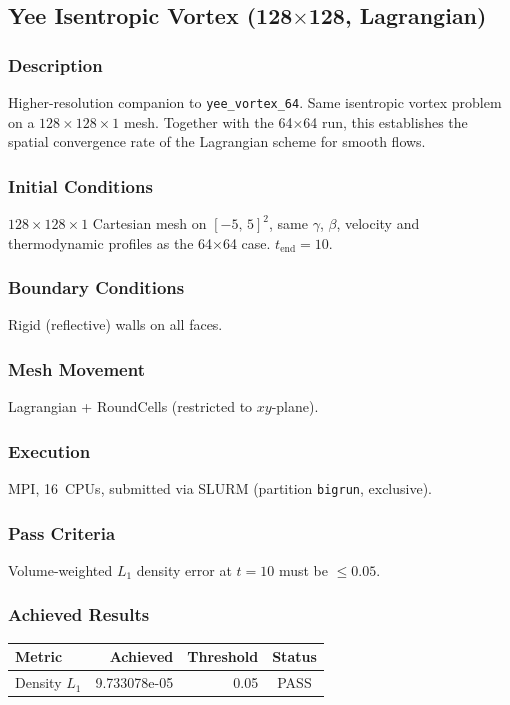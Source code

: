 \documentclass[11pt,a4paper]{article}
\begin{document}
\newpage

\subsection{Yee Isentropic Vortex (128$\times$128, Lagrangian)}
\label{sec:yee_vortex_128}

\subsubsection*{Description}
Higher-resolution companion to \texttt{yee\_vortex\_64}. Same isentropic vortex problem on a $128\times128\times1$ mesh. Together with the 64$\times$64 run, this establishes the spatial convergence rate of the Lagrangian scheme for smooth flows.

\subsubsection*{Initial Conditions}
$128\times128\times1$ Cartesian mesh on $[-5,\,5]^2$, same $\gamma$, $\beta$, velocity and thermodynamic profiles as the 64$\times$64 case. $t_{\mathrm{end}} = 10$.

\subsubsection*{Boundary Conditions}
Rigid (reflective) walls on all faces.

\subsubsection*{Mesh Movement}
Lagrangian + RoundCells (restricted to $xy$-plane).

\subsubsection*{Execution}
MPI, 16~CPUs, submitted via SLURM (partition \texttt{bigrun}, exclusive).

\subsubsection*{Pass Criteria}
Volume-weighted $L_1$ density error at $t=10$ must be $\le 0.05$.

\subsubsection*{Achieved Results}
\begin{table}[htbp]
\centering
\begin{tabular}{l r r c}
\toprule
\textbf{Metric} & \textbf{Achieved} & \textbf{Threshold} & \textbf{Status} \\
\midrule
Density $L_1$ & 9.733078e-05 & 0.05 & {\color{green!60!black}PASS} \\
\bottomrule
\end{tabular}
\end{table}
\end{document}
